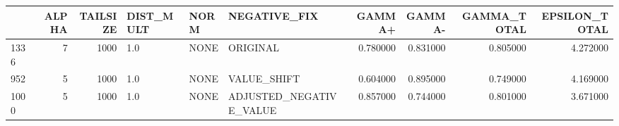 \begin{tabular}{lrrlllrrrr}
\toprule
 & ALPHA & TAILSIZE & DIST_MULT & NORM & NEGATIVE_FIX & GAMMA+ & GAMMA- & GAMMA_TOTAL & EPSILON_TOTAL \\
\midrule
1336 & 7 & 1000 & 1.0 & NONE & ORIGINAL & 0.780000 & 0.831000 & 0.805000 & 4.272000 \\
952 & 5 & 1000 & 1.0 & NONE & VALUE_SHIFT & 0.604000 & 0.895000 & 0.749000 & 4.169000 \\
1000 & 5 & 1000 & 1.0 & NONE & ADJUSTED_NEGATIVE_VALUE & 0.857000 & 0.744000 & 0.801000 & 3.671000 \\
\bottomrule
\end{tabular}
